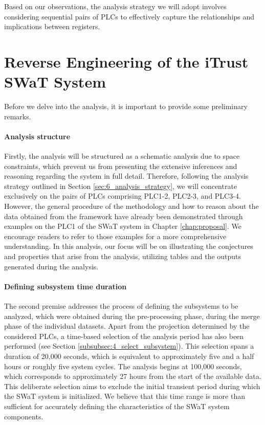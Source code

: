 \bigskip
Based on our observations, the analysis strategy we will adopt involves considering sequential pairs of PLCs to effectively capture the relationships and implications between registers. %

\section{Reverse Engineering of the iTrust SWaT System}
\label{sec:6_reverse_SWaT}
Before we delve into the analysis, it is important to provide some preliminary remarks. 

\paragraph{Analysis structure}
\label{par:6_analysis_struture}
Firstly, the analysis will be structured as a schematic analysis due to space constraints, which prevent us from presenting the extensive inferences and reasoning regarding the system in full detail. Therefore, following the analysis strategy outlined in Section \ref{sec:6_analysis_strategy}, we will concentrate exclusively on the pairs of PLCs comprising PLC1-2, PLC2-3, and PLC3-4. However, the general procedure of the methodology and how to reason about the data obtained from the framework have already been demonstrated through examples on the PLC1 of the SWaT system in Chapter \ref{chap:proposal}. We encourage readers to refer to those examples for a more comprehensive understanding. In this analysis, our focus will be on illustrating the conjectures and properties that arise from the analysis, utilizing tables and the outputs generated during the analysis.

\paragraph{Defining subsystem time duration}
\label{par:6_subsystem_duration}
The second premise addresses the process of defining the subsystems to be analyzed, which were obtained during the pre-processing phase, during the merge phase of the individual datasets. Apart from the projection determined by the considered PLCs, a time-based selection of the analysis period has also been performed (see Section \ref{subsubsec:4_select_subsystem}). This selection spans a duration of 20,000 seconds, which is equivalent to approximately five and a half hours or roughly five system cycles. The analysis begins at 100,000 seconds, which corresponds to approximately 27 hours from the start of the available data. This deliberate selection aims to exclude the initial transient period during which the SWaT system is initialized. We believe that this time range is more than sufficient for accurately defining the characteristics of the SWaT system components.

